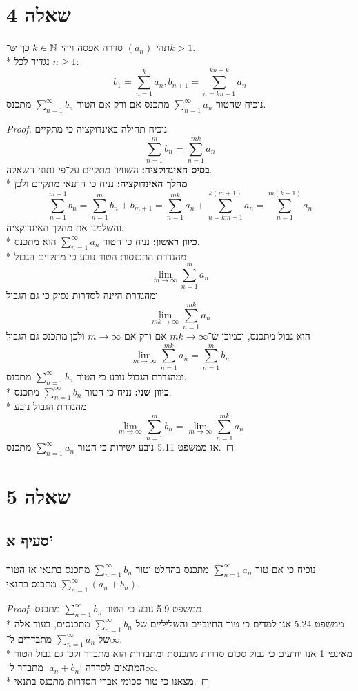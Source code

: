 \section{שאלה 4}
תהי $(a_n)$ סדרה אפסה ויהי $k \in \mathbb{N}$ כך ש־$k > 1$. \\*
נגדיר לכל $n \ge 1$:
\[
	b_1 = \sum_{n = 1}^{k} a_n,
	b_{n + 1} = \sum_{n = kn + 1}^{kn + k} a_n
\]
נוכיח שהטור $\sum_{n = 1}^{\infty} a_n$ מתכנס אם ורק אם הטור $\sum_{n = 1}^{\infty} b_n$ מתכנס.
\begin{proof}
	נוכיח תחילה באינדוקציה כי מתקיים
	\[
		\sum_{n = 1}^{m} b_n = \sum_{n = 1}^{mk} a_n
	\]
	\textbf{בסיס האינדוקציה:}
	השוויון מתקיים על־פי נתוני השאלה. \\*
	\textbf{מהלך האינדוקציה:}
	נניח כי התנאי מתקיים ולכן
	\[
		\sum_{n = 1}^{m + 1} b_n
		= \sum_{n = 1}^{m} b_n + b_{m + 1}
		= \sum_{n = 1}^{mk} a_n + \sum_{n = km + 1}^{k(m + 1)} a_n
		= \sum_{n = 1}^{m(k + 1)} a_n
	\]
	והשלמנו את מהלך האינדוקציה. \\*
	\textbf{כיוון ראשון:}
	נניח כי הטור $\sum_{n = 1}^{\infty} a_n$ הוא מתכנס. \\*
	מהגדרת התכנסות הטור נובע כי מתקיים הגבול
	\[
		\lim_{m \to \infty} \sum_{n = 1}^{m} a_n
	\]
	ומהגדרת היינה לסדרות נסיק כי גם הגבול
	\[
		\lim_{mk \to \infty} \sum_{n = 1}^{mk} a_n
	\]
	הוא גבול מתכנס, וכמובן ש־$mk \to \infty$ אם ורק אם $m \to \infty$ ולכן מתכנס גם הגבול
	\[
		\lim_{m \to \infty} \sum_{n = 1}^{mk} a_n = \sum_{n = 1}^{m} b_n
	\]
	ומהגדרת הגבול נובע כי הטור $\sum_{n = 1}^{\infty} b_n$ מתכנס. \\*
	\textbf{כיוון שני:}
	נניח כי הטור $\sum_{n = 1}^{\infty} b_n$ מתכנס. \\*
	מהגדרת הגבול נובע
	\[
		\lim_{m \to \infty} \sum_{n = 1}^{m} b_n
		= \lim_{m \to \infty} \sum_{n = 1}^{mk} a_n
	\]
	אז ממשפט 5.11 נובע ישירות כי הטור $\sum_{n = 1}^{\infty} a_n$ מתכנס.
\end{proof}

\section{שאלה 5}
\subsection{סעיף א'}
נוכיח כי אם טור $\sum_{n = 1}^{\infty} a_n$ מתכנס בהחלט
וטור $\sum_{n = 1}^{\infty} b_n$ מתכנס בתנאי אז הטור $\sum_{n = 1}^{\infty} (a_n + b_n)$ מתכנס בתנאי.
\begin{proof}
	ממשפט 5.9 נובע כי הטור $\sum_{n = 1}^{\infty} b_n$ מתכנס. \\*
	ממשפט 5.24 אנו למדים כי טור החיוביים והשליליים של $\sum_{n = 1}^{\infty} b_n$ מתכנסים, בעוד אלה של $\sum_{n = 1}^{\infty} a_n$ מתבדרים ל־$\infty$. \\*
	מאינפי 1 אנו יודעים כי גבול סכום סדרות מתכנסת ומתבדרת הוא מתבדר ולכן גם גבול הטור המתאים לסדרה $|a_n + b_n|$ מתבדר ל־$\infty$. \\*
	מצאנו כי טור סכומי אברי הסדרות מתכנס בתנאי.
\end{proof}

